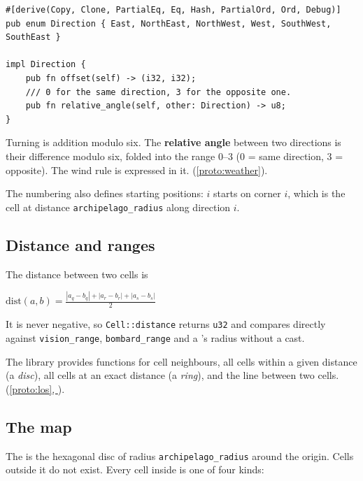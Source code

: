 \documentclass{article}
\newcommand{\fullref}[1]{\hyperref[#1]{\cref*{#1}, \nameref*{#1}}}
\begin{document}
\begin{lstlisting}
#[derive(Copy, Clone, PartialEq, Eq, Hash, PartialOrd, Ord, Debug)]
pub enum Direction { East, NorthEast, NorthWest, West, SouthWest, SouthEast }

impl Direction {
    pub fn offset(self) -> (i32, i32);
    /// 0 for the same direction, 3 for the opposite one.
    pub fn relative_angle(self, other: Direction) -> u8;
}
\end{lstlisting}

Turning is addition modulo six. The \textbf{relative angle} between two directions is their difference modulo six, folded into the range $0$--$3$ ($0$ = same direction, $3$ = opposite). The wind rule is expressed in it. (\cref{proto:weather}).

The numbering also defines starting positions: \ship{} $i$ starts on corner $i$, which is the cell at distance \texttt{archipelago\_radius} along direction $i$.\subsection{Distance and ranges}

The distance between two cells is

\begin{center}
$\mathrm{dist}(a,b) = \frac{|a_q - b_q| + |a_r - b_r| + |a_s - b_s|}{2}$
\end{center}

It is never negative, so \texttt{Cell::distance} returns \texttt{u32} and compares directly
against \texttt{vision\_range}, \texttt{bombard\_range} and a \clue's radius without a cast.

The library provides functions for cell neighbours, all cells within a given distance (a \emph{disc}), all cells at an exact distance (a \emph{ring}), and the line between two cells.
(\fullref{proto:los}).

\subsection{The map}
\label{proto:map}

The \archipelago{} is the hexagonal disc of radius \texttt{archipelago\_radius} around the origin. Cells outside it do not exist. Every cell inside is one of four kinds:
\end{document}
